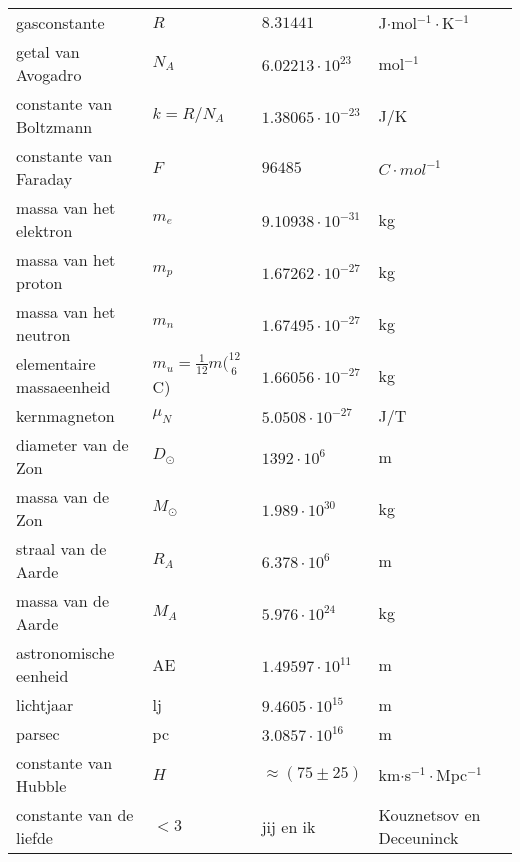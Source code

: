 \documentclass[dutch]{article}
\begin{document}
{\begin{tabular}{ l | l l l l}
        gasconstante & $R$ & $8.31441$ &J$\cdot$mol$^{-1}\cdot$K$^{-1}$ & \\
        getal van Avogadro & $N_{A}$ & $6.02213\cdot10^{23}$&mol$^{-1}$ & \\
        constante van Boltzmann & $k=R/N_{A}$ & $1.38065\cdot10^{-23}$ & J/K & \\
        constante van Faraday & $F$ & $96 485$ & $C\cdot mol^{-1}$ &\\
        \hline
        massa van het elektron & $m_{
            e}$ & $9.10938\cdot10^{-31}$ & kg & \\
        massa van het proton & $m_{p}$ & $1.67262\cdot10^{-27}$ & kg & \\
        massa van het neutron & $m_{n}$ & $1.67495\cdot10^{-27}$ & kg & \\
        elementaire massaeenheid & $m_{
            u}=\frac{1}{12}m(^{12}_{~6}$C)&$1.66056\cdot10^{-27}$ & kg & \\
        kernmagneton & $\mu_{N}$ & $5.0508\cdot10^{-27}$ & J/T\\
        \hline
        diameter van de Zon & $D_\odot$ & $1392\cdot10^6$ & m & \\
        massa van de Zon & $M_\odot$ & $1.989\cdot10^{30}$ & kg & \\
        straal van de Aarde & $R_{A}$ & $6.378\cdot10^6$ & m & \\
        massa van de Aarde & $M_{A}$ & $5.976\cdot10^{24}$ & kg & \\
        astronomische eenheid & AE & $1.49597\cdot10^{11}$ & m & \\
        lichtjaar & lj & $9.4605\cdot10^{15}$ & m & \\
        parsec & pc & $3.0857\cdot10^{16}$ & m & \\
        constante van Hubble & $H$ & $\approx(75\pm25)$ & km$\cdot$s$^{-1}\cdot$Mpc$^{-1}$
        & \\
        constante van de liefde & $<3$ & jij en ik & Kouznetsov en Deceuninck & \\
        \hline
    \end{tabular}
}
\end{document}
